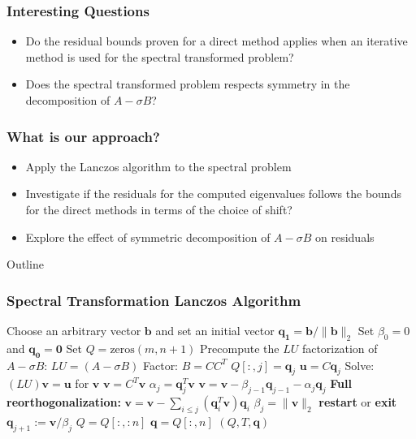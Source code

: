 \documentclass[landscape]{beamer}
\begin{document}
\begin{frame}
	\frametitle {Interesting Questions}
	\begin{center}
		\begin{itemize}
			\item \large Do the residual bounds proven for a direct method applies when an iterative method is used for the spectral transformed problem?
			\item \large Does the spectral transformed problem respects symmetry in the decomposition of $A - \sigma B$?
		\end{itemize}
	\end{center}
\end{frame}

\begin{frame}
	\frametitle{What is our approach?}
	\begin{itemize}
		\item Apply the Lanczos algorithm to the spectral problem
		\item Investigate if the residuals for the computed eigenvalues follows the bounds for the direct methods in terms of the choice of shift?
		\item Explore the effect of symmetric decomposition of $A- \sigma B$ on residuals
	\end{itemize}
\end{frame}

\begin{frame}[allowframebreaks]{Outline}
	\frametitle{Spectral Transformation Lanczos Algorithm}
	
	\begin{algorithmic}[1]
		\State Choose an arbitrary vector $\mathbf{b}$ and set an initial vector $\mathbf{q_1} = \mathbf{b}/ \|\mathbf{b}\|_2$
		\State Set $\beta_0 = 0$ and $\mathbf{q_0} = \mathbf{0}$
		\State Set $Q = \text{zeros}(m, n+1)$
		\State Precompute the $LU$ factorization of $A - \sigma B$: $LU = (A - \sigma B)$
		\State Factor: $B = CC^T$
		\State $Q[:, j] = \mathbf{q}_j$
		\State $\mathbf{u} = C\mathbf{q}_j$
		\State Solve: $(LU)\mathbf{v} = \mathbf{u}$ for $\mathbf{v}$
		\pause
		\State $\mathbf{v} = C^T \mathbf{v}$
		\State $\alpha_j = \mathbf{q}_j^T \mathbf{v} $
		\State $\mathbf{v} = \mathbf{v} - \beta_{j-1}\mathbf{q}_{j-1} - \alpha_j \mathbf{q}_j$
		\State \textbf{Full reorthogonalization:} $\mathbf{v} = \mathbf{v} - \sum_{i \leq j} (\mathbf{q}_i^T \mathbf{v}) \mathbf{q}_i$
		\State $\beta_{j} = \|\mathbf{v}\|_2$
		\State \textbf{restart} or \textbf{exit}
		\EndIf
		\State $\mathbf{q}_{j+1} := \mathbf{v} / \beta_{j}$
		\EndIf
		\EndFor
		\State $Q = Q[:, :n]$
		\State $\mathbf{q} = Q[:, n]$
		\State \Return $(Q, T, \mathbf{q})$
		\EndFunction
	\end{algorithmic}
\end{frame}
\end{document}

